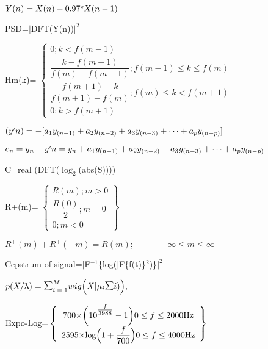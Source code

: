 \documentclass{article}
\begin{document}
$
Y(n)=X(n)-0.97\text{\small\raisebox{0.9ex}{\mbox{\scriptsize$\star$}}}X(n-1)
$

PSD=$|$DFT(Y(n))$|^2$ 

	Hm(k)=
$	\left\{
	\begin{array}{cc}
		0;k < f(m-1) \\
		\dfrac{k-f(m-1)}{f(m)-f(m-1)};f(m-1)\le k\le f(m) \\ 
		\dfrac{f(m+1)-k}{f(m+1)-f(m)};f(m)\le k<f(m+1) \\
		0;k>f(m+1)
	\end{array}
	\right.
$

$
(y\raisebox{0.3ex}{\mbox{\tiny$'$}}n)=-[a_1y_{(n-1)}+a_2y_{(n-2)}+a_3y_{(n-3)}+\cdots+a_py_{(n-p)}]
$

$
e_n=y_n-y\raisebox{0.3ex}{\mbox{\tiny$'$}}n=y_n+a_1y_{(n-1)}+a_2y_{(n-2)}+a_3y_{(n-3)}+\cdots+a_py_{(n-p)}
$

C=real (DFT($\log_2$(abs(S))))

R+(m)=
$	\left\{
	\begin{array}{cc}
		R(m);m>0 \\
		\dfrac{R(0)}{2};m=0 \\
		0;m<0
	\end{array}
	\right\}
$

$
R^+(m)+R^+(-m)=R(m);\ \ \ \ \ \ \ \ \ \ \ \ -\infty\le m\le\infty
$

Cepstrum of signal=$|$F$^{-1}$\{log($|$F\{f(t)\}$^2$)\}$|^2$

$
p(X/\uplambda)=\mbox{\Large$\sum_{\mbox{\scriptsize$i=1$}}^{\mbox{\scriptsize$M$}}$}wig\Big(X|\mu_i\mbox{\Large$\sum$}i)\Big),
$

$
\text{Expo-Log=}
\left\{
	\begin{array}{cc}
		700\text{\texttimes}\bigg(10^{\raisebox{0.8ex}{\mbox{\normalsize$\frac{f}{3988}$}}}-1\bigg)0\le f\le2000\text{Hz} \\
		2595\text{\texttimes}\text{log}\Big(1+\dfrac{f}{700}\Big)0\le f\le4000\text{Hz} 
	\end{array}
\right\}
$
\end{document}
